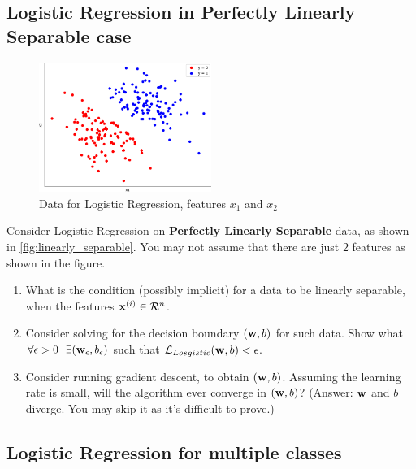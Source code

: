 





\subsection{Logistic Regression in Perfectly Linearly Separable case}

\begin{figure}[H]
    \centering
    \includegraphics[width=0.5\textwidth]{images/gaussian_separable_data_plot.png}
    \caption{Data for Logistic Regression, features $x_1$ and $x_2$}
    \label{fig:linearly_separable}
\end{figure}

Consider Logistic Regression on \textbf{Perfectly Linearly Separable} data, as shown in \autoref{fig:linearly_separable}. You may not assume that there are just $2$ features as shown in the figure.

\begin{enumerate}[label=\alph*)]
\item What is the condition (possibly implicit) for a data to be linearly separable, when the features $\mathbf{x}^{(i)} \in \mathcal{R}^n$.

\item Consider solving for the decision boundary $(\mathbf{w}, b)$ for such data. Show what $\forall \epsilon > 0 \ \ \exists (\mathbf{w}_{\epsilon}, b_{\epsilon})$ such that $\mathcal{L}_{Losgistic}(\mathbf{w}, b) < \epsilon$.

\item Consider running gradient descent, to obtain $(\mathbf{w}, b)$. Assuming the learning rate is small, will the algorithm ever converge in $(\mathbf{w}, b)$? (Answer: $\mathbf{w}$ and $b$ diverge. You may skip it as it's difficult to prove.)
\end{enumerate}





\subsection{Logistic Regression for multiple classes}

